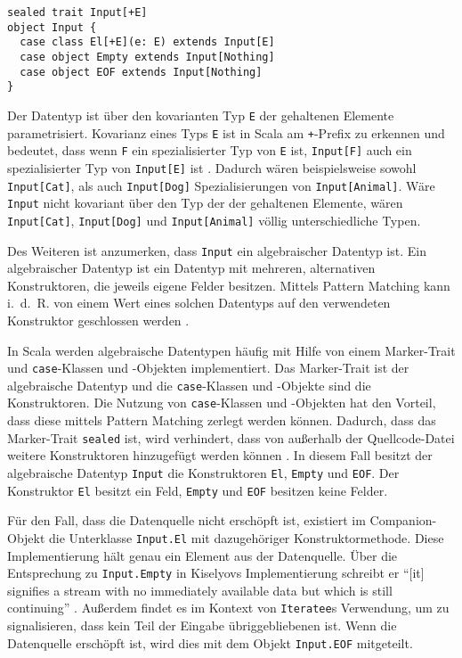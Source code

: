 \begin{lstlisting}[caption=Der Input-Datentyp, label=lst:der_input_datentyp]
sealed trait Input[+E]
object Input {
  case class El[+E](e: E) extends Input[E]
  case object Empty extends Input[Nothing]
  case object EOF extends Input[Nothing]
}
\end{lstlisting}

Der Datentyp ist über den kovarianten Typ \lstinline|E| der gehaltenen Elemente parametrisiert.
Kovarianz eines Typs \lstinline|E| ist in Scala am \lstinline|+|-Prefix zu erkennen und bedeutet, dass wenn \lstinline|F| ein spezialisierter Typ von \lstinline|E| ist, \lstinline|Input[F]| auch ein spezialisierter Typ von \lstinline|Input[E]| ist \cite[vgl.][S.~393]{programming_in_scala}.
Dadurch wären beispielsweise sowohl \lstinline|Input[Cat]|, als auch \lstinline|Input[Dog]| Spezialisierungen von \lstinline|Input[Animal]|.
Wäre \lstinline|Input| nicht kovariant über den Typ der der gehaltenen Elemente, wären \lstinline|Input[Cat]|, \lstinline|Input[Dog]| und \lstinline|Input[Animal]| völlig unterschiedliche Typen.

Des Weiteren ist anzumerken, dass \lstinline|Input| ein algebraischer Datentyp ist.
Ein algebraischer Datentyp ist ein Datentyp mit mehreren, alternativen Konstruktoren, die jeweils eigene Felder besitzen.
Mittels Pattern Matching kann i.~d.~R. von einem Wert eines solchen Datentyps auf den verwendeten Konstruktor geschlossen werden \cite[vgl.][S.~14--15]{algebraic_data_type}.

In Scala werden algebraische Datentypen häufig mit Hilfe von einem Marker-Trait und \lstinline|case|-Klassen und -Objekten implementiert.
Das Marker-Trait ist der algebraische Datentyp und die \lstinline|case|-Klassen und -Objekte sind die Konstruktoren.
Die Nutzung von \lstinline|case|-Klassen und -Objekten hat den Vorteil, dass diese mittels Pattern Matching zerlegt werden können.
Dadurch, dass das Marker-Trait \lstinline|sealed| ist, wird verhindert, dass von außerhalb der Quellcode-Datei weitere Konstruktoren hinzugefügt werden können \cite[vgl.][]{algebraic_data_type_scala}.
In diesem Fall besitzt der algebraische Datentyp \lstinline|Input| die Konstruktoren \lstinline|El|, \lstinline|Empty| und \lstinline|EOF|.
Der Konstruktor \lstinline|El| besitzt ein Feld, \lstinline|Empty| und \lstinline|EOF| besitzen keine Felder.

Für den Fall, dass die Datenquelle nicht erschöpft ist, existiert im Companion-Objekt die Unterklasse \lstinline|Input.El| mit dazugehöriger Konstruktormethode.
Diese Implementierung hält genau ein Element aus der Datenquelle.
Über die Entsprechung zu \lstinline|Input.Empty| in Kiselyovs Implementierung schreibt er "`[it] signifies a stream with no immediately available data but which is still continuing"' \cite[vgl.][]{iteratee_io}.
Außerdem findet es im Kontext von \lstinline|Iteratee|s Verwendung, um zu signalisieren, dass kein Teil der Eingabe übriggebliebenen ist.
Wenn die Datenquelle erschöpft ist, wird dies mit dem Objekt \lstinline|Input.EOF| mitgeteilt.

